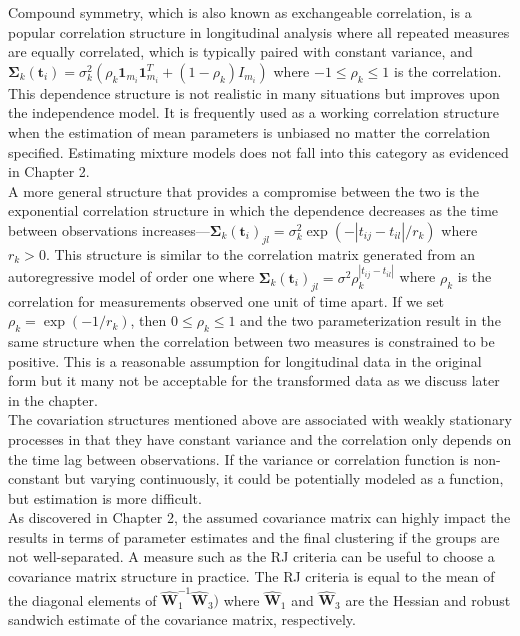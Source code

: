 \documentclass[12pt]{article}
\newcommand{\B}[0]{\mathbf}
\begin{document}
Compound symmetry, which is also known as exchangeable correlation, is a popular correlation structure in longitudinal analysis where all repeated measures are equally correlated, which is typically paired with constant variance, and $\B \Sigma_{k}(\B t_{i}) = \sigma_{k}^{2}(\rho_{k}\B1_{m_{i}}\B1_{m_{i}}^{T}+(1-\rho_{k})I_{m_{i}})$ where $-1\leq\rho_{k}\leq 1$ is the correlation. This dependence structure is not realistic in  many situations but improves upon the independence model. It is frequently used as a working correlation structure when the estimation of mean parameters is unbiased no matter the correlation specified. Estimating mixture models does not fall into this category as evidenced in Chapter 2.\\

A more general structure that provides a compromise between the two is the exponential correlation structure in which the dependence decreases as the time between observations increases---$\B \Sigma_{k}(\B t_{i})_{jl} = \sigma_{k}^{2}\exp(-| t_{ij}-t_{il}| / r_{k})$ where $r_{k}> 0$. This structure is similar to the correlation matrix generated from an autoregressive model of order one where $\B\Sigma_{k}(\B t_{i})_{jl} = \sigma^{2}\rho_{k}^{|t_{ij}-t_{il}|}$ where $\rho_{k}$ is the correlation for measurements observed one unit of time apart. If we set $\rho_{k} = \exp(-1/r_{k})$, then $0\leq\rho_{k}\leq1$ and the two parameterization result in the same structure when the correlation between two measures is constrained to be positive. This is a reasonable assumption for longitudinal data in the original form but it many not be acceptable for the transformed data as we discuss later in the chapter.\\

The covariation structures mentioned above are associated with weakly stationary processes in that they have constant variance and the correlation only depends on the time lag between observations. If the variance or correlation function is non-constant but varying continuously, it could be potentially modeled as a function, but estimation is more difficult.\\

As discovered in Chapter 2, the assumed covariance matrix can highly impact the results in terms of parameter estimates and the final clustering if the groups are not well-separated. A measure such as the RJ criteria can be useful to choose a covariance matrix structure in practice. The RJ criteria is equal to the mean of the diagonal elements of $\widehat{\B W}_{1}^{-1}\widehat{\B W}_{3})$ where $\widehat{\B W}_{1}$ and $\widehat{\B W}_{3}$ are the Hessian and robust sandwich estimate of the covariance matrix, respectively.  
\end{document}
